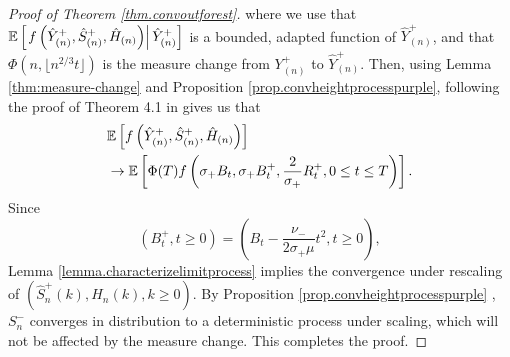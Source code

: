 \begin{proof}[Proof of Theorem \ref{thm.convoutforest}]
where we use that ${\mathbb E}\left[\left. f\left(\hat{Y}^+_{(n)},\hat{S}^+_{(n)},  \hat{H}_{(n)}\right)\right|\hat{Y}^+_{(n)}\right]$ is a bounded, adapted function of $\hat{Y}^+_{(n)}$, and that $\Phi(n,\lfloor n^{2/3} t\rfloor)$ is the measure change from ${Y}^+_{(n)}$ to $\hat{Y}^+_{(n)}$. Then, using Lemma \ref{thm:measure-change} and Proposition \ref{prop.convheightprocesspurple}, following the proof of Theorem 4.1 in \cite{conchon--kerjanStableGraphMetric2020} gives us that 
\begin{align*}
    &{\mathbb E}\left[f\left(\hat{Y}^+_{(n)},\hat{S}^+_{(n)},  \hat{H}_{(n)}\right) \right]\\
    &\to {\mathbb E}\left[\Phi(T)f\left(\sigma_+ B_t,\sigma_+ B^+_t,\frac{2}{\sigma_+}R^+_t,0\leq t \leq T\right)\right].
\end{align*}
Since $$(B^+_t,t\geq 0)=\left(B_t-\frac{\nu_-}{2\sigma_+ \mu}t^2,t\geq 0\right),$$
Lemma \ref{lemma.characterizelimitprocess} implies the convergence under rescaling of $(\hat{S}^+_n(k),\hat{H}_n(k),k\geq 0)$. By Proposition \ref{prop.convheightprocesspurple} , $S^{-}_n$ converges in distribution to a deterministic process under scaling, which will not be affected by the measure change. This completes the proof. 
\end{proof}

